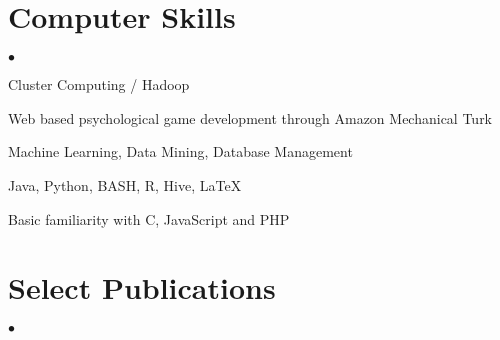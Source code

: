 \documentclass[margin,line]{res}
\newenvironment{list2}{
  \begin{list}{$\bullet$}{%
      \setlength{\itemsep}{0in}
      \setlength{\parsep}{0in} \setlength{\parskip}{0in}
      \setlength{\topsep}{0in} \setlength{\partopsep}{0in} 
      \setlength{\leftmargin}{10pt}}}{\end{list}}
\begin{document}
\begin{resume}
\section{\sc Computer Skills} 
\begin{list2}
\item Cluster Computing / Hadoop 
\item Web based psychological game development through Amazon Mechanical Turk
\item Machine Learning, Data Mining, Database Management
\item Java, Python, BASH, R, Hive, \LaTeX
\item Basic familiarity with C,  JavaScript and PHP
\end{list2}

\section{\sc Select Publications}

\begin{list2}



\end{list2}
\end{resume}
\end{document}

